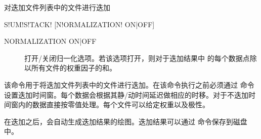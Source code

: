 \label{sss:sumstack}

对迭加文件列表中的文件进行迭加

\begin{SACSTX}
S!UM!S!TACK! [N!ORMALIZATION! ON|OFF]
\end{SACSTX}

\begin{description}
\item [NORMALIZATION ON|OFF] 打开/关闭归一化选项。若该选项打开，则对于迭加结果中
的每个数据点除以所有文件的权重因子的和。
\end{description}

该命令用于将迭加文件列表中的文件进行迭加。在该命令执行之前必须通过  命令设置迭加时间窗。每个数据会根据其静/动时间延迟做相应的时移。对于不迭加时间窗内的数据直接按零值处理。每个文件可以给定权重以及极性。

在迭加之后，会自动生成迭加结果的绘图。迭加结果可以通过  命令保存到磁盘中。
